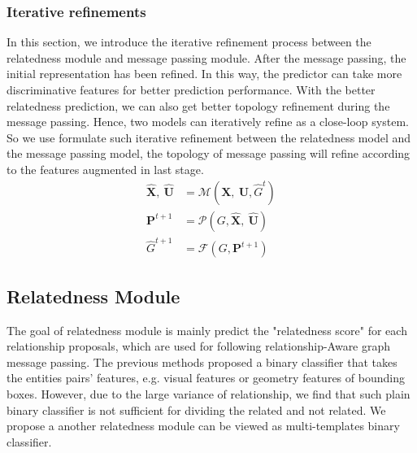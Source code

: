 
\subsubsection{Iterative refinements}
In this section, we introduce the iterative refinement process between the relatedness module and message passing module. 
After the message passing, the initial representation has been refined. In this way, the predictor can take more discriminative features for better prediction performance. 
With the better relatedness prediction, we can also get better topology refinement during the message passing. 
Hence, two models can iteratively refine as a close-loop system. So we use formulate such iterative refinement between the relatedness model and the message passing model, the topology of message passing will refine according to the features augmented in last stage.
\begin{align}
    \mathbf{\hat{X}},~ \mathbf{\hat{U}}  &= \mathcal{M}(\mathbf{X},~ \mathbf{U}, \hat{G}^t) \\
    \mathbf{P}^{t+1} &= \mathcal{P}(G, \mathbf{\hat{X}},~ \mathbf{\hat{U}}) \\
    \hat{G}^{t+1} &= \mathcal{F}(G, \mathbf{P}^{t+1})
\label{rel_GMSP_relness2} 
\end{align}



\subsection{Relatedness Module}
The goal of relatedness module is mainly predict the "relatedness score" for each relationship proposals, which are used for following relationship-Aware graph message passing. 
The previous methods proposed a binary classifier that takes the entities pairs' features, e.g. visual features or geometry features of bounding boxes. 
However, due to the large variance of relationship, we find that such plain binary classifier is not sufficient for dividing the related and not related. We propose a another relatedness module can be viewed as multi-templates binary classifier.

